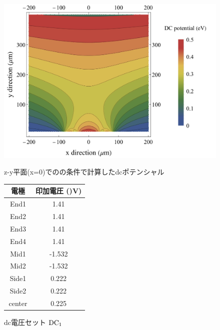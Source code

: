 \begin{figure}[h]
	\begin{center}
		\begin{minipage}{0.45\linewidth}
			\begin{center}
				\includegraphics[width = 0.9\columnwidth]{./simulation/figure/dc_potential_example.png}
					\caption{z-y平面(x=0)でのの条件で計算したdcポテンシャル}
			\end{center}
		\end{minipage}
		\begin{minipage}{0.45\linewidth}
			\begin{center}
				\caption{dc電圧セット ${\rm DC}_{1}$}
				\label{tab:dc_set1}
				\begin{tabular}{c|c} \hline \hline
					電極　& 印加電圧 ()V) \\ \hline
					End1 & 1.41 \\ \hline
					End2 & 1.41 \\ \hline
					End3 & 1.41 \\ \hline
					End4 & 1.41 \\ \hline
					Mid1 & -1.532 \\ \hline
					Mid2 & -1.532 \\ \hline
					Side1 & 0.222 \\ \hline
					Side2 & 0.222 \\ \hline
					center & 0.225 \\ \hline
				\end{tabular}
			\end{center}
		\end{minipage}
	\end{center}
\end{figure}

